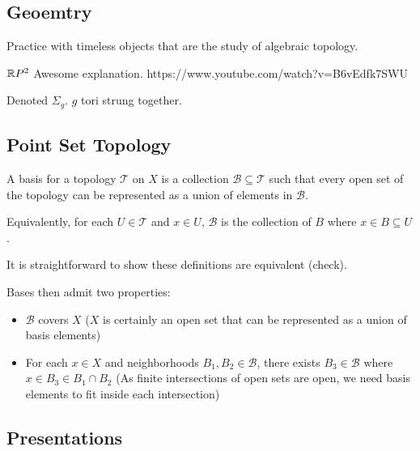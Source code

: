\documentclass[10pt]{article}
\begin{document}
\begin{definition}
\begin{definition}
\subsection{Geoemtry}

Practice with timeless objects that are the study of algebraic topology.

\begin{note}
	$\mathbb{R} P^2$
Awesome explanation. https://www.youtube.com/watch?v=B6vEdfk7SWU
\end{note}

\begin{note}
Denoted $\Sigma_g$. $g$ tori strung together.
\end{note}

\subsection{Point Set Topology}

\begin{definition}[Basis]

	A basis for a topology $\mathscr{T}$ on $X$ is a collection $\mathscr{B}
	\subseteq \mathscr{T}$ such that every open set of the topology can be
	represented as a union of elements in $\mathscr{B}$.

	Equivalently, for each $U \in \mathscr{T}$ and $x \in U$, $\mathscr{B}$
	is the collection of $B$ where $x \in B \subseteq U$.

\end{definition}

It is straightforward to show these definitions are equivalent (check).

Bases then admit two properties:
\begin{itemize}
	\item{$\mathscr{B}$ covers $X$ ($X$ is certainly an open set that can be
		represented as a union of basis elements)}
\item{For each $x \in X$ and neighborhoods $B_1, B_2 \in \mathscr{B}$, there exists $B_3 \in
	\mathscr{B}$ where $x \in B_3 \in B_1 \cap B_2$ (As finite intersections of
open sets are open, we need basis elements to fit inside each intersection)}
\end{itemize}

\subsection{Presentations}


\end{definition}
\end{definition}
\end{document}
